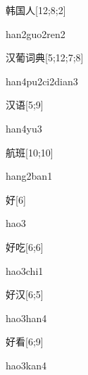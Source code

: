 \begin{verbete}{韩国人}[12;8;2]
\begin{pronuncia}{han2guo2ren2}
\end{pronuncia}
\end{verbete}

\begin{verbete}{汉葡词典}[5;12;7;8]
\begin{pronuncia}[\\]{han4pu2ci2dian3}
\end{pronuncia}
\end{verbete}

\begin{verbete}[han4yu3]{汉语}[5;9]
\begin{pronuncia}{han4yu3}
\end{pronuncia}
\end{verbete}

\begin{verbete}{航班}[10;10]
\begin{pronuncia}{hang2ban1}
\end{pronuncia}
\end{verbete}

\begin{verbete}[hao3]{好}[6]
\begin{pronuncia}{hao3}
\end{pronuncia}
\end{verbete}

\begin{verbete}{好吃}[6;6]
\begin{pronuncia}{hao3chi1}
\end{pronuncia}
\end{verbete}

\begin{verbete}{好汉}[6;5]
\begin{pronuncia}{hao3han4}
\end{pronuncia}
\end{verbete}

\begin{verbete}{好看}[6;9]
\begin{pronuncia}{hao3kan4}
\end{pronuncia}
\end{verbete}

